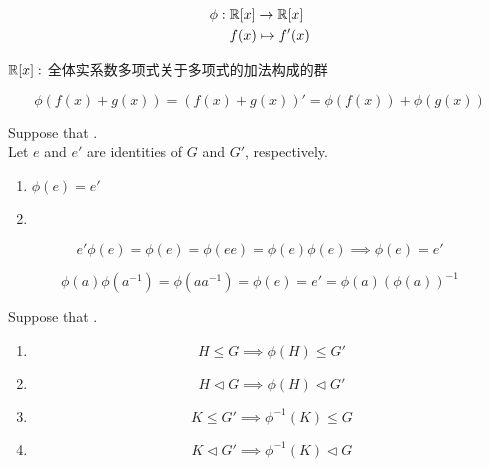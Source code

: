 \begin{frame}{}
  \begin{align*}
    \phi:\; & \mathbb{R}[x] \to \mathbb{R}[x] \\
            & f(x) \mapsto f'(x)
  \end{align*}

  \vspace{0.30cm}
  \begin{center}
    $\mathbb{R}[x]:$ 全体实系数多项式关于多项式的加法构成的群
  \end{center}

  \[
    \phi(f(x) + g(x)) = (f(x) + g(x))' = \phi(f(x)) + \phi(g(x))
  \]
\end{frame}

\begin{frame}{}
  \begin{theorem}
    Suppose that . \\
    Let $e$ and $e'$ are identities of $G$ and $G'$, respectively.

    \begin{enumerate}[(1)]
      \setlength{\itemsep}{6pt}
      \item $\phi(e) = e'$
      \item {}
    \end{enumerate}
  \end{theorem}

  \pause
  \[
    e' \phi(e) = \phi(e) = \phi(e e) = \phi(e) \phi(e) \implies \phi(e) = e'
  \]

  \pause
  \[
    \phi(a)\phi(a^{-1}) = \phi(aa^{-1}) = \phi(e) = e' = \phi(a)(\phi(a))^{-1}
  \]
\end{frame}

\begin{frame}
  \begin{theorem}
    Suppose that . \\
    \begin{enumerate}[(1)]
      \item
        \[
          H \le G \implies \phi(H) \le G'
        \]
      \item
        \[
          H \triangleleft G \implies \phi(H) \triangleleft G'
        \]
      \pause
      \item
        \[
          K \le G' \implies \phi^{-1}(K) \le G
        \]
      \item
        \[
          K \triangleleft G' \implies \phi^{-1}(K) \triangleleft G
        \]
    \end{enumerate}
  \end{theorem}
\end{frame}

